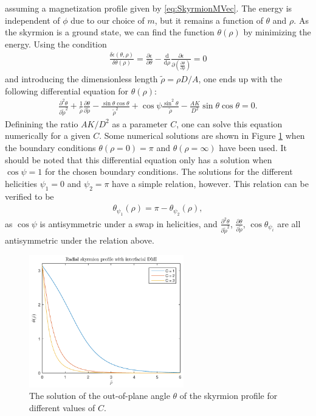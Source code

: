 assuming a magnetization profile given by \eqref{eq:SkyrmionMVec}. The energy is independent of $\phi$ due to our choice of $m$, but it remains a function of $\theta$ and $\rho$. As the skyrmion is a ground state, we can find the function $\theta(\rho)$ by minimizing the energy. Using the condition
\begin{align}
\frac{\delta\epsilon(\theta, \rho)}{\delta\theta(\rho)} = \frac{\partial\epsilon}{\partial\theta} - \frac{\textrm{d}}{\textrm{d}\rho} \frac{\partial\epsilon}{\partial (\frac{\partial\theta}{\partial \rho})} = 0
\end{align}
and introducing the dimensionless length $\tilde{\rho} = \rho D/A$, one ends up with the following differential equation for $\theta(\rho)$:
\begin{align}
\label{eq:ODEtheta}
\frac{\partial^2\theta}{\partial\tilde{\rho}^2} + \frac{1}{\tilde{\rho}}\frac{\partial\theta}{\partial\tilde{\rho}} - \frac{\sin\theta\cos\theta}{\tilde{\rho}^2}+\cos\psi\frac{\sin^2\theta}{\tilde{\rho}}-\frac{AK}{D^2}\sin\theta\cos\theta = 0.
\end{align}
Definining the ratio $AK/D^2$ as a parameter $C$, one can solve this equation numerically for a given $C$. Some numerical solutions are shown in Figure \ref{fig:ThetaProfile} when the boundary conditions $\theta(\rho = 0) = \pi$ and $\theta(\rho = \infty)$ have been used. It should be noted that this differential equation only has a solution when $\cos\psi = 1$ for the chosen boundary conditions. The solutions for the different helicities $\psi_1 = 0$ and $\psi_2 = \pi$ have a simple relation, however. This relation can be verified to be
\begin{align}
\label{eq:ThetaHelicityRelation}
\theta_{\psi_1}(\rho) = \pi - \theta_{\psi_2}(\rho),
\end{align}
as $\cos\psi$ is antisymmetric under a swap in helicities, and $\frac{\partial^2\theta}{\partial\tilde{\rho}^2}$, $\frac{\partial\theta}{\partial\tilde{\rho}}$, $\cos\theta_{\psi_i}$ are all antisymmetric under the relation above.
\begin{figure}[h!]
\begin{center}
\includegraphics[width=0.6\textwidth]{Figures/SkyrmionRadialProfiles.pdf} 
\caption{The solution of the out-of-plane angle $\theta$ of the skyrmion profile for different values of $C$.}
\label{fig:ThetaProfile} 
\end{center}
\end{figure}
